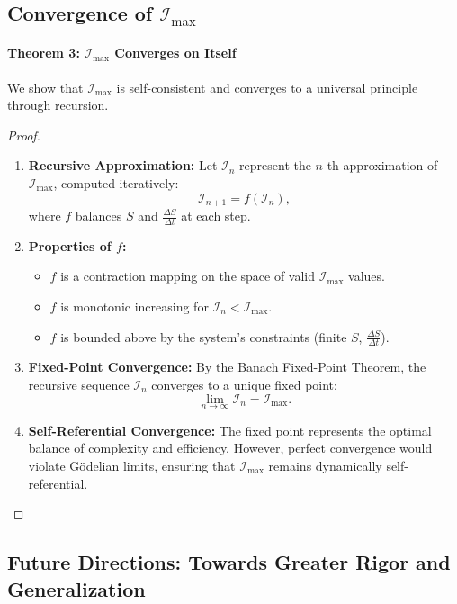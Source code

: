 \documentclass[12pt]{article}
\begin{document}
\subsection{Convergence of \(\mathcal{I}_{\text{max}}\)}

\paragraph{Theorem 3: \(\mathcal{I}_{\text{max}}\) Converges on Itself}
We show that \(\mathcal{I}_{\text{max}}\) is self-consistent and converges to a universal principle through recursion.

\begin{proof}
\begin{enumerate}
    \item \textbf{Recursive Approximation:}
    Let \(\mathcal{I}_n\) represent the \(n\)-th approximation of \(\mathcal{I}_{\text{max}}\), computed iteratively:
    \[
    \mathcal{I}_{n+1} = f(\mathcal{I}_n),
    \]
    where \(f\) balances \(S\) and \(\frac{\Delta S}{\Delta t}\) at each step.

    \item \textbf{Properties of \(f\):}
    \begin{itemize}
        \item \(f\) is a contraction mapping on the space of valid \(\mathcal{I}_{\text{max}}\) values.
        \item \(f\) is monotonic increasing for \(\mathcal{I}_n < \mathcal{I}_{\text{max}}\).
        \item \(f\) is bounded above by the system's constraints (finite \(S\), \(\frac{\Delta S}{\Delta t}\)).
    \end{itemize}

    \item \textbf{Fixed-Point Convergence:}
    By the Banach Fixed-Point Theorem, the recursive sequence \(\mathcal{I}_n\) converges to a unique fixed point:
    \[
    \lim_{n \to \infty} \mathcal{I}_n = \mathcal{I}_{\text{max}}.
    \]

    \item \textbf{Self-Referential Convergence:}
    The fixed point represents the optimal balance of complexity and efficiency. However, perfect convergence would violate Gödelian limits, ensuring that \(\mathcal{I}_{\text{max}}\) remains dynamically self-referential.
\end{enumerate}
\end{proof}

\subsection{Future Directions: Towards Greater Rigor and Generalization}
\end{document}
